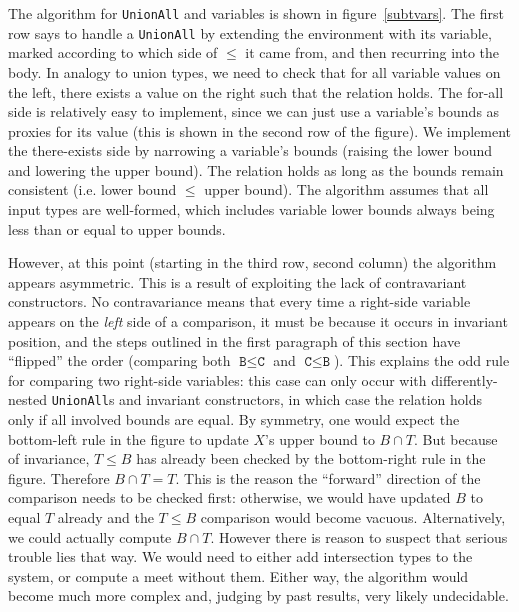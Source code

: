 The algorithm for \texttt{UnionAll} and variables is shown in figure~\ref{subtvars}.
The first row says to handle a \texttt{UnionAll} by extending the environment
with its variable, marked according to which side of $\leq$ it came from,
and then recurring into the body.
In analogy to union types, we need to check that for all variable values on
the left, there exists a value on the right such that the relation holds.
The for-all side is relatively easy to implement, since we can just use
a variable's bounds as proxies for its value (this is shown in
the second row of the figure).
We implement the there-exists side by narrowing a variable's bounds
(raising the lower bound and lowering the upper bound). The relation holds
as long as the bounds remain consistent (i.e. lower bound $\leq$
upper bound). The algorithm assumes that all input types are well-formed,
which includes variable lower bounds always being less than or equal to
upper bounds.

However, at this point (starting in the third row, second column) the
algorithm appears asymmetric. This is a result of exploiting the lack of
contravariant constructors. No contravariance means that every time a
right-side variable appears on the \emph{left} side of a comparison,
it must be because it occurs in invariant position, and the steps outlined
in the first paragraph of this section have ``flipped'' the order
(comparing both $\texttt{B}\leq\texttt{C}$ and $\texttt{C}\leq\texttt{B}$).
This explains the odd rule for comparing two right-side variables:
this case can only occur with differently-nested \texttt{UnionAll}s and
invariant constructors, in which case the relation holds only if
all involved bounds are equal.
By symmetry, one would expect the bottom-left rule in the figure to
update $X$'s upper bound to $B\cap T$. But because of invariance,
$T\leq B$ has already been checked by the bottom-right rule in the
figure. Therefore $B\cap T = T$. This is the reason the ``forward''
direction of the comparison needs to be checked first: otherwise,
we would have updated $B$ to equal $T$ already and the $T\leq B$
comparison would become vacuous. Alternatively, we could actually
compute $B\cap T$. However there is reason to suspect that serious
trouble lies that way. We would need to either add intersection types
to the system, or compute a meet without them. Either way, the
algorithm would become much more complex and, judging by past
results, very likely undecidable.


